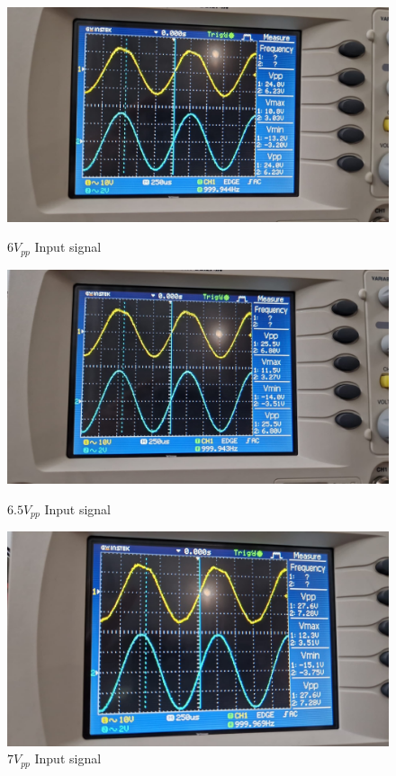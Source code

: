 \begin{figure}[h]
    \centering
    \begin{minipage}{.4\textwidth}
        \includegraphics[width=1\linewidth]{assets/p3-exp-6.png}
        \caption{$6V_{pp}$ Input signal}
        \label{fig:p3-exp-6}
    \end{minipage}%
    \begin{minipage}{.4\textwidth}
        \includegraphics[width=1\linewidth]{assets/p3-exp-6.5.png}
        \caption{$6.5V_{pp}$ Input signal}
        \label{fig:p3-exp-6.5}
    \end{minipage}
    \begin{minipage}{.4\textwidth}
        \includegraphics[width=1\linewidth]{assets/p3-exp-7.png}
        \caption{$7V_{pp}$ Input signal}
        \label{fig:p3-exp-7}
    \end{minipage}
\end{figure}

